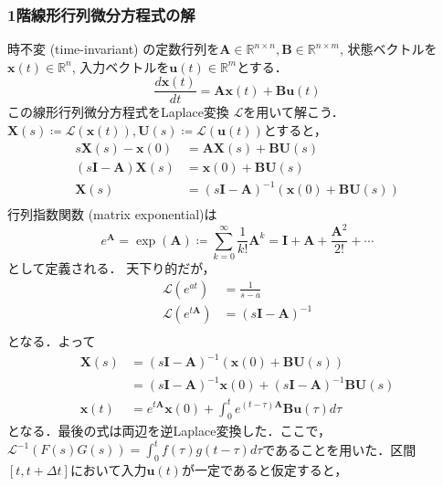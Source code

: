 \subsubsection{1階線形行列微分方程式の解}
時不変 (time-invariant) の定数行列を$\mathbf{A} \in \mathbb{R}^{n\times n}, \mathbf{B} \in \mathbb{R}^{n\times m}$, 状態ベクトルを$\mathbf{x}(t)\in\mathbb{R}^n$, 入力ベクトルを$\mathbf{u}(t)\in\mathbb{R}^m$とする．
\begin{equation}
\frac{d\mathbf{x}(t)}{dt} = \mathbf{A}\mathbf{x}(t) + \mathbf{B}\mathbf{u}(t)
\end{equation}
この線形行列微分方程式をLaplace変換 $\mathcal{L}$を用いて解こう．$\boldsymbol{X}(s) \coloneqq \mathcal{L}(\mathbf{x}(t)), \boldsymbol{U}(s) \coloneqq \mathcal{L}(\mathbf{u}(t))$とすると，
\begin{align}
s\boldsymbol{X}(s) - \mathbf{x}(0) &= \mathbf{A}\boldsymbol{X}(s)+ \mathbf{B}\boldsymbol{U}(s)\\
(s\mathbf{I} - \mathbf{A}) \boldsymbol{X}(s) &= \mathbf{x}(0) + \mathbf{B}\boldsymbol{U}(s)\\
\boldsymbol{X}(s) &= (s\mathbf{I} - \mathbf{A})^{-1}(\mathbf{x}(0) + \mathbf{B}\boldsymbol{U}(s))\\
\end{align}
行列指数関数 (matrix exponential)は
\begin{equation}
e^\mathbf{A} = \exp(\mathbf{A}) \coloneqq \sum_{k=0}^\infty \frac{1}{k!}\mathbf{A}^k = \mathbf{I}+\mathbf{A}+\frac{\mathbf{A}^2}{2!}+\cdots
\end{equation}
として定義される．
天下り的だが，
\begin{align}
\mathcal{L}(e^{at})&=\frac{1}{s-a}\\
\mathcal{L}(e^{t\mathbf{A}})&=(s\mathbf{I} - \mathbf{A})^{-1}\\
\end{align}
となる．よって
\begin{align}
\boldsymbol{X}(s) &= (s\mathbf{I} - \mathbf{A})^{-1}(\mathbf{x}(0) + \mathbf{B}\boldsymbol{U}(s))\\
&= (s\mathbf{I} - \mathbf{A})^{-1}\mathbf{x}(0) + (s\mathbf{I} - \mathbf{A})^{-1}\mathbf{B}\boldsymbol{U}(s)\\
\mathbf{x}(t)&=e^{t\mathbf{A}}\mathbf{x}(0)+\int_0^t e^{(t-\tau)\mathbf{A}}\mathbf{B}\mathbf{u}(\tau) d\tau
\end{align}
となる．最後の式は両辺を逆Laplace変換した．ここで，$\mathcal{L}^{-1}(F(s)G(s))=\int_0^tf(\tau)g(t-\tau)d\tau$であることを用いた．区間$[t, t+\Delta t]$において入力$\mathbf{u}(t)$が一定であると仮定すると，
